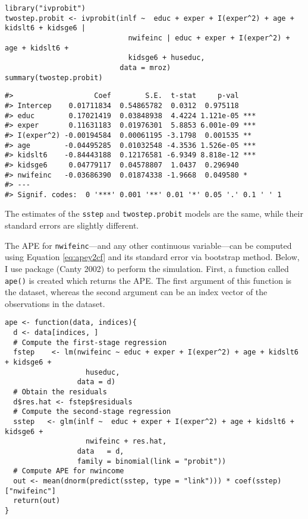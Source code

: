 \begin{verbatim}
library("ivprobit")
twostep.probit <- ivprobit(inlf ~  educ + exper + I(exper^2) + age + kidslt6 + kidsge6 | 
                             nwifeinc | educ + exper + I(exper^2) + age + kidslt6 + 
                             kidsge6 + huseduc, 
                           data = mroz)
summary(twostep.probit)
\end{verbatim}

\begin{verbatim}
#>                   Coef        S.E.  t-stat     p-val    
#> Intercep    0.01711834  0.54865782  0.0312  0.975118    
#> educ        0.17021419  0.03848938  4.4224 1.121e-05 ***
#> exper       0.11631183  0.01976301  5.8853 6.001e-09 ***
#> I(exper^2) -0.00194584  0.00061195 -3.1798  0.001535 ** 
#> age        -0.04495285  0.01032548 -4.3536 1.526e-05 ***
#> kidslt6    -0.84443188  0.12176581 -6.9349 8.818e-12 ***
#> kidsge6     0.04779117  0.04578807  1.0437  0.296940    
#> nwifeinc   -0.03686390  0.01874338 -1.9668  0.049580 *  
#> ---
#> Signif. codes:  0 '***' 0.001 '**' 0.01 '*' 0.05 '.' 0.1 ' ' 1
\end{verbatim}

The estimates of the \texttt{sstep} and \texttt{twostep.probit} models are the same, while their standard errors are slightly different.

The APE for \texttt{nwifeinc}---and any other continuous variable---can be computed using Equation \eqref{eq:apey2cf} and its standard error via bootstrap method. Below, I use package  (Canty 2002) to perform the simulation. First, a function called \texttt{ape()} is created which returns the APE. The first argument of this function is the dataset, whereas the second argument can be an index vector of the observations in the dataset.

\begin{verbatim}
ape <- function(data, indices){
  d <- data[indices, ]
  # Compute the first-stage regression
  fstep    <- lm(nwifeinc ~ educ + exper + I(exper^2) + age + kidslt6 + kidsge6 + 
                   huseduc, 
                 data = d)
  # Obtain the residuals 
  d$res.hat <- fstep$residuals
  # Compute the second-stage regression
  sstep   <- glm(inlf ~  educ + exper + I(exper^2) + age + kidslt6 + kidsge6 + 
                   nwifeinc + res.hat, 
                 data   = d, 
                 family = binomial(link = "probit"))
  # Compute APE for nwincome
  out <- mean(dnorm(predict(sstep, type = "link"))) * coef(sstep)["nwifeinc"]
  return(out)
}
\end{verbatim}

